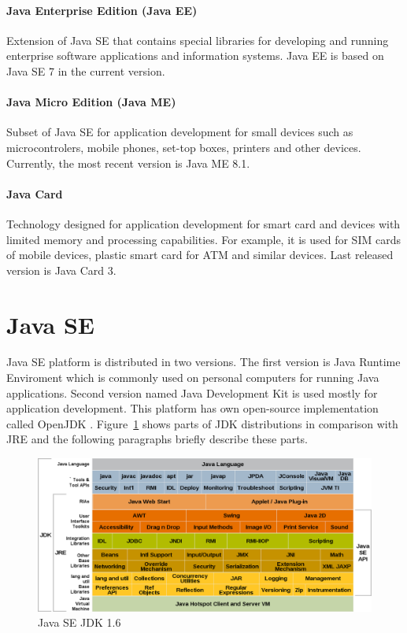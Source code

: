 \paragraph{Java Enterprise Edition (Java EE)}
Extension of Java SE that contains special libraries for developing and running enterprise software applications and information systems. Java EE is based on Java SE 7 in the current version.

\paragraph{Java Micro Edition (Java ME)}
Subset of Java SE for application development for small devices such as microcontrolers, mobile phones, set-top boxes, printers and other devices. Currently, the most recent version is Java ME 8.1.

\paragraph{Java Card}
Technology designed for application development for smart card and devices with limited memory and processing capabilities. For example, it is used for SIM cards of mobile devices, plastic smart card for ATM and similar devices. Last released version is Java Card 3.

\section{Java SE}\label{JavaSE}
Java SE platform is distributed in two versions. The first version is Java Runtime Enviroment which is commonly used on personal computers for running Java applications. Second version named Java Development Kit is used mostly for application development. This platform has own open-source implementation called OpenJDK \cite{OpenJDK}. Figure~\ref{Java6JDK} shows parts of JDK distributions in comparison with JRE and the following paragraphs briefly describe these parts.
\\
\begin{figure}[h!]
    \centering
    \includegraphics[scale=0.35]{fig/java_6_jdk.png}
    \caption{Java SE JDK 1.6 \cite{Java6Doc}}
    \label{Java6JDK}
\end{figure}

